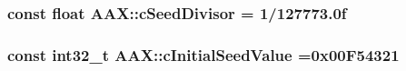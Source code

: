 \subsubsection[{c\+Seed\+Divisor}]{\setlength{\rightskip}{0pt plus 5cm}const float A\+A\+X\+::c\+Seed\+Divisor = 1/127773.\+0f}\label{a00288_a0c975151f0d47cc80eef9ff5a7c80125}
\hypertarget{a00288_a143d659ccb62ae0807e9902e751b14cf}{}
\subsubsection[{c\+Initial\+Seed\+Value}]{\setlength{\rightskip}{0pt plus 5cm}const int32\+\_\+t A\+A\+X\+::c\+Initial\+Seed\+Value =0x00\+F54321}\label{a00288_a143d659ccb62ae0807e9902e751b14cf}
